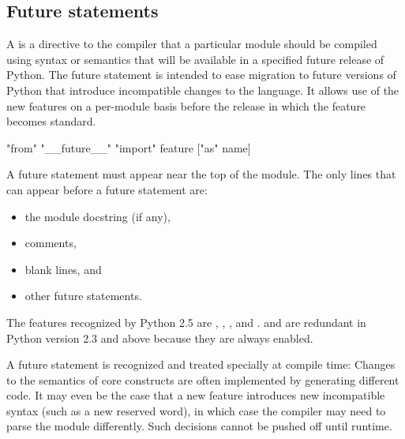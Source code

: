 \subsection{Future statements \label{future}}

A  is a directive to
the compiler that a particular module should be compiled using syntax
or semantics that will be available in a specified future release of
Python.  The future statement is intended to ease migration to future
versions of Python that introduce incompatible changes to the
language.  It allows use of the new features on a per-module basis
before the release in which the feature becomes standard.

\begin{productionlist}[*]
             {"from" "__future__" "import" feature ["as" name]}
\end{productionlist}

A future statement must appear near the top of the module.  The only
lines that can appear before a future statement are:

\begin{itemize}

\item the module docstring (if any),
\item comments,
\item blank lines, and
\item other future statements.

\end{itemize}

The features recognized by Python 2.5 are ,
, ,  and
.   and  
are redundant in Python version 2.3 and above because they are always
enabled. 

A future statement is recognized and treated specially at compile
time: Changes to the semantics of core constructs are often
implemented by generating different code.  It may even be the case
that a new feature introduces new incompatible syntax (such as a new
reserved word), in which case the compiler may need to parse the
module differently.  Such decisions cannot be pushed off until
runtime.

